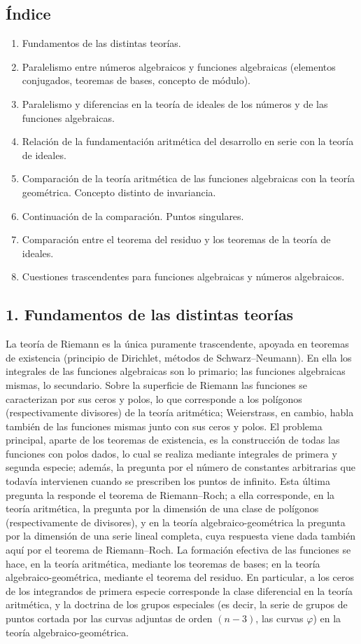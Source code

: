 \documentclass[11pt]{article}
\begin{document}
\subsection*{Índice}
\begin{enumerate}
\item Fundamentos de las distintas teorías.
\item Paralelismo entre números algebraicos y funciones algebraicas (elementos conjugados, teoremas de bases, concepto de módulo).
\item Paralelismo y diferencias en la teoría de ideales de los números y de las funciones algebraicas.
\item Relación de la fundamentación aritmética del desarrollo en serie con la teoría de ideales.
\item Comparación de la teoría aritmética de las funciones algebraicas con la teoría geométrica. Concepto distinto de invariancia.
\item Continuación de la comparación. Puntos singulares.
\item Comparación entre el teorema del residuo y los teoremas de la teoría de ideales.
\item Cuestiones trascendentes para funciones algebraicas y números algebraicos.
\end{enumerate}

\subsection*{1. Fundamentos de las distintas teorías}
La teoría de Riemann es la única puramente trascendente, apoyada en teoremas de existencia (principio de Dirichlet, métodos de Schwarz--Neumann). En ella los integrales de las funciones algebraicas son lo primario; las funciones algebraicas mismas, lo secundario. Sobre la superficie de Riemann las funciones se caracterizan por sus ceros y polos, lo que corresponde a los polígonos (respectivamente divisores) de la teoría aritmética; Weierstrass, en cambio, habla también de las funciones mismas junto con sus ceros y polos. El problema principal, aparte de los teoremas de existencia, es la construcción de todas las funciones con polos dados, lo cual se realiza mediante integrales de primera y segunda especie; además, la pregunta por el número de constantes arbitrarias que todavía intervienen cuando se prescriben los puntos de infinito. Esta última pregunta la responde el teorema de Riemann--Roch; a ella corresponde, en la teoría aritmética, la pregunta por la dimensión de una clase de polígonos (respectivamente de divisores), y en la teoría algebraico-geométrica la pregunta por la dimensión de una serie lineal completa, cuya respuesta viene dada también aquí por el teorema de Riemann--Roch. La formación efectiva de las funciones se hace, en la teoría aritmética, mediante los teoremas de bases; en la teoría algebraico-geométrica, mediante el teorema del residuo. En particular, a los ceros de los integrandos de primera especie corresponde la clase diferencial en la teoría aritmética, y la doctrina de los grupos especiales (es decir, la serie de grupos de puntos cortada por las curvas adjuntas de orden \((n-3)\), las curvas \(\varphi\)) en la teoría algebraico-geométrica.
\end{document}
